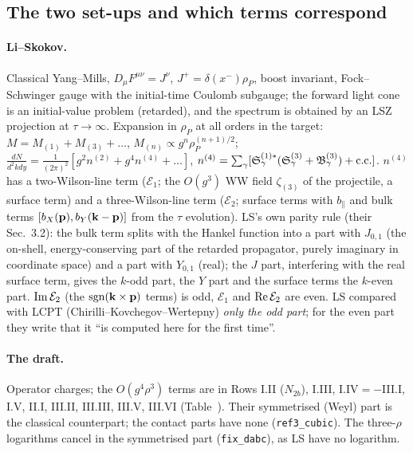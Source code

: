 \subsection{The two set-ups and which terms correspond}\label{ls:setup}
\paragraph{Li--Skokov.} Classical Yang--Mills, $D_\mu F^{\mu\nu}=J^\nu$, $J^+=\delta(x^-)\rho_P$, boost invariant, Fock--Schwinger gauge with the initial-time Coulomb subgauge; the forward light cone is an initial-value problem (retarded), and the spectrum is obtained by an LSZ projection at $\tau\to\infty$. Expansion in $\rho_P$ at all orders in the target: $M=M_{(1)}+M_{(3)}+\dots$, $M_{(n)}\propto g^n\rho_P^{(n+1)/2}$; $\frac{dN}{d^2kdy}=\frac{1}{(2\pi)^2}[g^2n^{(2)}+g^4n^{(4)}+\dots]$, $n^{(4)}=\sum_\gamma[\mathfrak S^{(1)*}_\gamma(\mathfrak S^{(3)}_\gamma+\mathfrak B^{(3)}_\gamma)+{\rm c.c.}]$. $n^{(4)}$ has a two-Wilson-line term ($\mathcal E_1$; the $O(g^3)$ WW field $\zeta_{(3)}$ of the projectile, a surface term) and a three-Wilson-line term ($\mathcal E_2$; surface terms with $b_\|$ and bulk terms $[b_X(\mathbf{p}),b_Y(\mathbf{k}-\mathbf{p})]$ from the $\tau$ evolution). LS's own parity rule (their Sec.~3.2): the bulk term splits with the Hankel function into a part with $J_{0,1}$ (the on-shell, energy-conserving part of the retarded propagator, purely imaginary in coordinate space) and a part with $Y_{0,1}$ (real); the $J$ part, interfering with the real surface term, gives the $k$-odd part, the $Y$ part and the surface terms the $k$-even part. ${\rm Im}\,\mathcal E_2$ (the ${\rm sgn}(\mathbf{k}\times\mathbf{p})$ terms) is odd, $\mathcal E_1$ and ${\rm Re}\,\mathcal E_2$ are even. LS compared with LCPT (Chirilli--Kovchegov--Wertepny) \emph{only the odd part}; for the even part they write that it ``is computed here for the first time''.
\paragraph{The draft.} Operator charges; the $O(g^4\rho^3)$ terms are in Rows I.II ($N_{2b}$), I.III, I.IV$=-$III.I, I.V, II.I, III.II, III.III, III.V, III.VI (Table~). Their symmetrised (Weyl) part is the classical counterpart; the contact parts have none (\texttt{ref3\_cubic}). The three-$\rho$ logarithms cancel in the symmetrised part (\texttt{fix\_dabc}), as LS have no logarithm.
